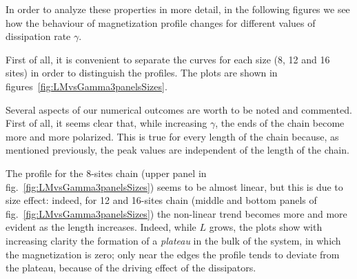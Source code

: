 In order to analyze these properties in more detail, in the following figures we see how the behaviour of magnetization profile changes for different values of dissipation rate $\gamma$. 

First of all, it is convenient to separate the curves for each size (8, 12 and 16 sites) in order to distinguish the profiles. The plots are shown in figures~\ref{fig:LMvsGamma3panelsSizes}.

Several aspects of our numerical outcomes are worth to be noted and commented. First of all, it seems clear that, while increasing $\gamma$, the ends of the chain become more and more polarized. This is true for every length of the chain because, as mentioned previously, the peak values are independent of the length of the chain.

The profile for the 8-sites chain (upper panel in fig.~\ref{fig:LMvsGamma3panelsSizes}) seems to be almost linear, but this is due to size effect: indeed, for 12 and 16-sites chain (middle and bottom panels of fig.~\ref{fig:LMvsGamma3panelsSizes}) the non-linear trend becomes more and more evident as the length increases. Indeed, while $L$ grows, the plots show with increasing clarity the formation of a \emph{plateau} in the bulk of the system, in which the magnetization is zero; only near the edges the profile tends to deviate from the plateau, because of the driving effect of the dissipators.

